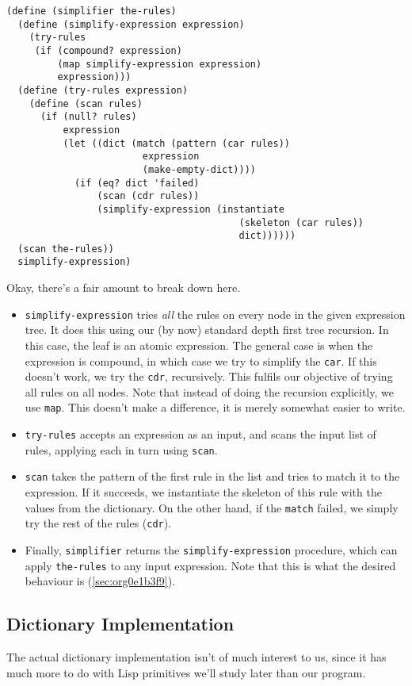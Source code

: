 \documentclass[9pt]{report}
\begin{document}
\begin{verbatim}
(define (simplifier the-rules)
  (define (simplify-expression expression)
    (try-rules
     (if (compound? expression)
         (map simplify-expression expression)
         expression)))
  (define (try-rules expression)
    (define (scan rules)
      (if (null? rules)
          expression
          (let ((dict (match (pattern (car rules))
                        expression
                        (make-empty-dict))))
            (if (eq? dict 'failed)
                (scan (cdr rules))
                (simplify-expression (instantiate
                                         (skeleton (car rules))
                                         dict))))))
  (scan the-rules))
  simplify-expression)
\end{verbatim}

Okay, there's a fair amount to break down here.
\begin{itemize}
\item \texttt{simplify-expression} tries \emph{all} the rules on every node in the
given expression tree. It does this using our (by now) standard
depth first tree recursion. In this case, the leaf is an atomic
expression. The general case is when the expression is compound,
in which case we try to simplify the \texttt{car}. If this doesn't
work, we try the \texttt{cdr}, recursively. This fulfils our objective
of trying all rules on all nodes. Note that instead of doing the
recursion explicitly, we use \texttt{map}. This doesn't make a
difference, it is merely somewhat easier to write.
\item \texttt{try-rules} accepts an expression as an input, and scans the
input list of rules, applying each in turn using \texttt{scan}.
\item \texttt{scan} takes the pattern of the first rule in the list and tries
to match it to the expression. If it succeeds, we instantiate
the skeleton of this rule with the values from the dictionary.
On the other hand, if the \texttt{match} failed, we simply try the rest
of the rules (\texttt{cdr}).
\item Finally, \texttt{simplifier} returns the \texttt{simplify-expression}
procedure, which can apply \texttt{the-rules} to any input expression.
Note that this is what the desired behaviour is (\ref{sec:org0e1b3f9}).
\end{itemize}

\subsection{Dictionary Implementation}
\label{sec:org45bb10f}
The actual dictionary implementation isn't of much interest to us,
since it has much more to do with Lisp primitives we'll study
later than our program.
\end{document}
